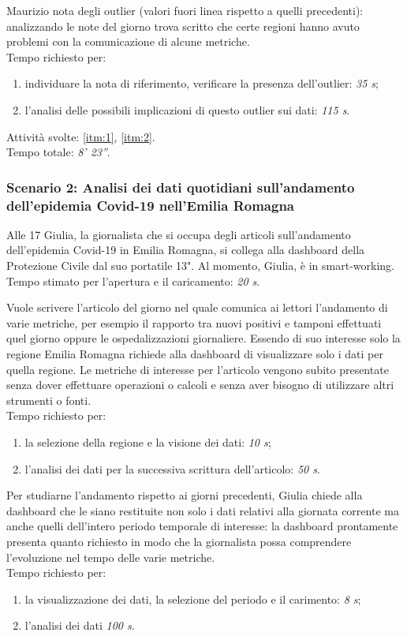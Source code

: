 Maurizio nota degli outlier (valori fuori linea rispetto a quelli precedenti):  analizzando le note del giorno trova scritto che certe regioni hanno avuto problemi con la comunicazione di alcune metriche.\\
Tempo richiesto per:
\begin{enumerate}
    \item individuare la nota di riferimento, verificare la presenza dell'outlier: \textit{35 s};
    \item l'analisi delle possibili implicazioni di questo outlier sui dati: \textit{115 s}.
\end{enumerate}
\noindent
Attività svolte: \ref{itm:1}, \ref{itm:2}.\\ 
Tempo totale: \textit{8' 23''}. 

\subsubsection*{Scenario 2: Analisi dei dati quotidiani sull'andamento dell'epidemia Covid-19 nell'Emilia Romagna}
Alle 17 Giulia, la giornalista che si occupa degli articoli sull'andamento dell'epidemia Covid-19 in Emilia Romagna, si collega alla dashboard della Protezione Civile dal suo portatile 13". Al momento, Giulia, è in smart-working.\\
Tempo stimato per l'apertura e il caricamento: \textit{20 s}. 

Vuole scrivere l'articolo del giorno nel quale comunica ai lettori l'andamento di varie metriche, per esempio il rapporto tra nuovi positivi e tamponi effettuati quel giorno oppure le ospedalizzazioni giornaliere. Essendo di suo interesse solo la regione Emilia Romagna richiede alla dashboard di visualizzare solo i dati per quella regione. Le metriche di interesse per l'articolo vengono subito presentate senza dover effettuare operazioni o calcoli e senza aver bisogno di utilizzare altri strumenti o fonti.\\
Tempo richiesto per:
\begin{enumerate}
    \item la selezione della regione e la visione dei dati: \textit{10 s};
    \item l'analisi dei dati per la successiva scrittura dell'articolo: \textit{50 s}.
\end{enumerate}

Per studiarne l'andamento rispetto ai giorni precedenti, Giulia chiede alla dashboard che le siano restituite non solo i dati relativi alla giornata corrente ma anche quelli dell'intero periodo temporale di interesse: la dashboard prontamente presenta quanto richiesto in modo che la giornalista possa comprendere l'evoluzione nel tempo delle varie metriche.\\
Tempo richiesto per:
\begin{enumerate}
    \item la visualizzazione dei dati, la selezione del periodo e il carimento: \textit{8 s};
    \item l'analisi dei dati \textit{100 s}.
\end{enumerate}

